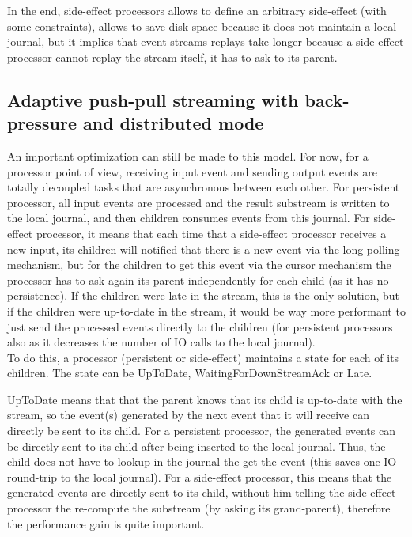 In the end, side-effect processors allows to define an arbitrary side-effect (with some constraints), allows to save disk space because it does not maintain
a local journal, but it implies that event streams replays take longer because a side-effect processor cannot replay the stream itself, it has to ask to its parent.


\subsection{Adaptive push-pull streaming with back-pressure and distributed mode}

An important optimization can still be made to this model. For now, for a processor point of view, receiving input event and sending output events are totally
decoupled tasks that are asynchronous between each other. For persistent processor, all input events are processed and the result substream is written to the local journal, and then children consumes events from this journal. For side-effect processor, it means that each time that a side-effect processor receives a new input, its children will notified that there is a new event via the long-polling mechanism, but for the children to get this event via the cursor mechanism the processor has to ask again its parent independently for each child (as it has no persistence). 
If the children were late in the stream, this is the only solution, but if the children were up-to-date in the stream, it would be way more performant to just send the processed events directly to the children (for persistent processors also as it decreases the number of IO calls to the local journal).
\\

To do this, a processor (persistent or side-effect) maintains a state for each of its children. The state can be UpToDate, WaitingForDownStreamAck or Late.

UpToDate means that that the parent knows that its child is up-to-date with the stream, so the event(s) generated by the next event that it will receive can 
directly be sent to its child. For a persistent processor, the generated events can be directly sent to its child after being inserted to the local journal. Thus,
the child does not have to lookup in the journal the get the event (this saves one IO round-trip to the local journal). For a side-effect processor, this means
that the generated events are directly sent to its child, without him telling the side-effect processor the re-compute the substream (by asking its grand-parent), therefore the performance gain is quite important.

